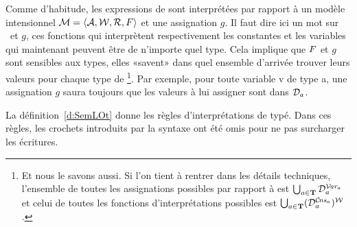 Comme d'habitude, les expressions de {\LO} sont interprétées par rapport à un modèle intensionnel \(\mathcal{M}=\langle \mathcal{A},\mathcal{W},\mathcal{R},{F} \rangle\) et une assignation $g$. Il faut dire ici un mot sur  \FI\ et $g$, ces fonctions qui interprètent respectivement les constantes et les variables qui maintenant peuvent être de n'importe quel type.  Cela implique que ${F}$ et $g$ sont sensibles aux types, elles «savent» dans quel ensemble d'arrivée trouver leurs valeurs pour chaque type de {\Types}\footnote{Et nous le savons aussi.  Si l'on tient à rentrer dans les détails techniques, l'ensemble de toutes les assignations possibles par rapport à {\Modele} est \(\bigcup_{a\in\textbf{T}}\mathcal{D}_a^{\mathcal{V}\kern-.12em\textit{ar}_a}\) et celui de toutes les fonctions d'interprétations possibles est \(\bigcup_{a\in\textbf{T}}(\mathcal{D}_a^{\mathcal{C}\kern-.12em\textit{ns}_a})^{\mathcal{W}}\). }.  Par exemple, pour toute variable \vrb v de type \mtyp a, une assignation $g$ saura toujours que les valeurs à lui assigner sont dans $\mathcal{D}_a$. 


La définition~\ref{d:SemLOt} donne les règles d'interprétations de {\LO} typé.
Dans ces règles, les crochets introduits par la syntaxe ont été omis pour ne pas surcharger les écritures. %


